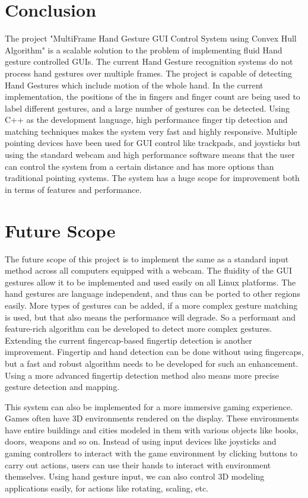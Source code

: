 \documentclass[11pt]{report}
\begin{document}
\chapter{Conclusion}

The project "MultiFrame Hand Gesture GUI Control System using Convex Hull Algorithm" is a scalable solution to the problem of implementing fluid Hand gesture controlled GUIs. The current Hand Gesture recognition systems do not process hand gestures over multiple frames. The project is capable of detecting Hand Gestures which include motion of the whole hand. In the current implementation, the positions of the in fingers and finger count are being used to label different gestures, and a large number of gestures can be detected. Using C++ as the development language, high performance finger tip detection and matching techniques makes the system very fast and highly responsive. Multiple pointing devices have been used for GUI control like trackpads, and joysticks but using the standard webcam and high performance software means that the user can control the system from a certain distance and has more options than traditional pointing systems. The system has a huge scope for improvement both in terms of features and performance.
    
\chapter{Future Scope}

The future scope of this project is to implement the same as a standard input method across all computers equipped with a webcam. The fluidity of the GUI gestures allow it to be implemented and used easily on all Linux platforms. The hand gestures are language independent, and thus can be ported to other regions easily. More types of gestures can be added, if a more complex gesture matching is used, but that also means the performance will degrade. So a performant and feature-rich algorithm can be developed to detect more complex gestures. Extending the current fingercap-based fingertip detection is another improvement. Fingertip and hand detection can be done without using fingercaps, but a fast and robust algorithm needs to be developed for such an enhancement. Using a more advanced fingertip detection method also means more precise gesture detection and mapping.


This system can also be implemented for a more immersive gaming experience. Games often have 3D environments rendered on the display. These environments have entire buildings and cities modeled in them with various objects like books, doors, weapons and so on. Instead of using input devices like joysticks and gaming controllers to interact with the game environment by clicking buttons to carry out actions, users can use their hands to interact with environment themselves. Using hand gesture input, we can also control 3D modeling applications easily, for actions like rotating, scaling, etc.
\end{document}
